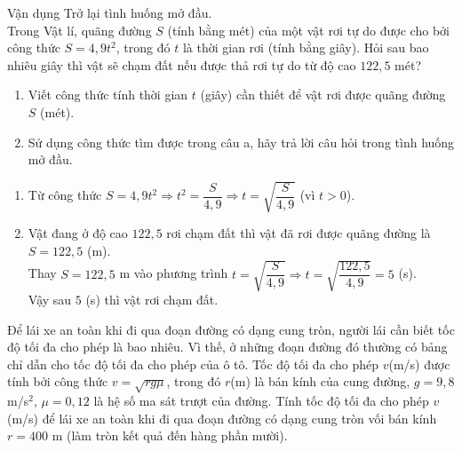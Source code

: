 \begin{vd}
	Vận dụng Trở lại tình huống mở đầu.\\
	Trong Vật lí, quãng đường $S$ (tính bằng mét) của một vật rơi tự do được cho bởi công thức $S=4{,}9t^2$, trong đó $t$ là thời gian rơi (tính bằng giây). Hỏi sau bao nhiêu giây thì vật sẽ chạm đất nếu được thả rơi tự do từ độ cao $122{,}5$ mét?
	\begin{enumerate}
	\item Viết công thức tính thời gian $t$ (giây) cần thiết để vật rơi được quãng đường $S$ (mét).
	\item Sử dụng công thức tìm được trong câu a, hãy trả lời câu hỏi trong tình huống mở đầu.
	\end{enumerate}
	\loigiai
	{
	\begin{enumerate}
	\item Từ công thức $S=4{,}9t^2\Rightarrow t^2=\dfrac{S}{4{,}9}\Rightarrow t=\sqrt{\dfrac{S}{4{,}9}}$ (vì $t>0$).\\
	\item Vật đang ở độ cao $122{,}5$ rơi chạm đất thì vật đã rơi được quãng đường là $S=122{,}5$ (m).\\
	Thay $S=122{,}5$ m vào phương trình $t=\sqrt{\dfrac{S}{4{,}9}}\Rightarrow t=\sqrt{\dfrac{122{,}5}{4{,}9}}=5$ (s).\\
	Vậy sau $5$ (s) thì vật rơi chạm đất.
	\end{enumerate}	
	}
\end{vd}
\begin{vd}
	Để lái xe an toàn khi đi qua đoạn đường có dạng cung tròn, người lái cần biết tốc độ tối đa cho phép là bao nhiêu. Vì thế, ở những đoạn đường đó thường có bảng chỉ dẫn cho tốc độ tối đa cho phép của ô tô. Tốc độ tối đa cho phép $v$(m/s) được tính bởi công thức $v=\sqrt{rg\mu}$, trong đó $r$(m) là bán kính của cung đường, $g=9{,}8$m/s$^2$, $\mu=0{,}12$ là hệ số ma sát trượt của đường. Tính tốc độ tối đa cho phép $v$ (m/s) để lái xe an toàn khi đi qua đoạn đường có dạng cung tròn vối bán kính $r=400$ m (làm tròn kết quả đến hàng phần mười).
\end{vd}
